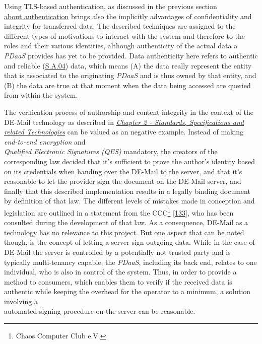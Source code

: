 \documentclass[12pt,english,a4paper,titlepage,cleardoublepage=empty,dottedtoc]{report}
\begin{document}
Using TLS-based authentication, as discussed in the previous section\\
\protect\hyperlink{authentication}{about authentication} brings also the
implicitly advantages of confidentiality and integrity for transferred
data. The described techniques are assigned to the different types of
motivations to interact with the system and therefore to the roles and
their various identities, although authenticity of the actual data a
\emph{PDaaS} provides has yet to be provided. Data authenticity here
refers to authentic and reliable (\protect\hyperlink{sa04}{S.A.04})
data, which means (A) the data really represent the entity that is
associated to the originating \emph{PDaaS} and is thus owned by that
entity, and (B) the data are true at that moment when the data being
accessed are queried from within the system.

The verification process of authorship and content integrity in the
context of the DE-Mail technology as described in
\emph{\protect\hyperlink{standards-specifications-and-related-technologies}{Chapter
2 - Standards, Specifications and related Technologies}} can be valued
as an negative example. Instead of making \emph{end-to-end encryption}
and\\
\emph{Qualified Electronic Signatures (QES)} mandatory, the creators of
the corresponding law decided that it's sufficient to prove the author's
identity based on its credentials when handing over the DE-Mail to the
server, and that it's reasonable to let the provider sign the document
on the DE-Mail server, and finally that this described implementation
results in a legally binding document by definition of that law. The
different levels of mistakes made in conception and legislation are
outlined in a statement from the CCC\footnote{Chaos Computer Club e.V.}
{[}\protect\hyperlink{ref-statement_2013_de-mail}{133}{]}, who has been
consulted during the development of that law. As a consequence, DE-Mail
as a technology has no relevance to this project. But one aspect that
can be noted though, is the concept of letting a server sign outgoing
data. While in the case of DE-Mail the server is controlled by a
potentially not trusted party and is typically multi-tenancy capable,
the \emph{PDaaS}, including its back end, relates to one individual, who
is also in control of the system. Thus, in order to provide a method to
consumers, which enables them to verify if the received data is
authentic while keeping the overhead for the operator to a minimum, a
solution involving a\\
automated signing procedure on the server can be reasonable.
\end{document}
